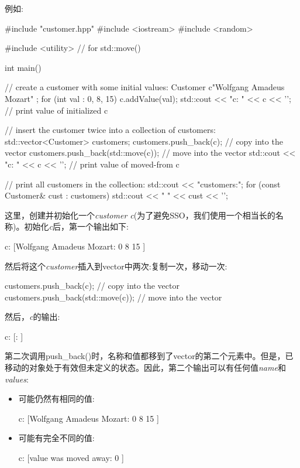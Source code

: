 例如:

\begin{cppcode}
#include "customer.hpp"
#include <iostream>
#include <random>

#include <utility> // for std::move()

int main()
{
	// create a customer with some initial values:
	Customer c{"Wolfgang Amadeus Mozart" };
	for (int val : {0, 8, 15}) {
		c.addValue(val);
	}
	std::cout << "c: " << c << '\n'; // print value of initialized c

	// insert the customer twice into a collection of customers:
	std::vector<Customer> customers;
	customers.push_back(c); // copy into the vector
	customers.push_back(std::move(c)); // move into the vector
	std::cout << "c: " << c << '\n'; // print value of moved-from c

	// print all customers in the collection:
	std::cout << "customers:\n";
	for (const Customer& cust : customers) {
		std::cout << " " << cust << '\n';
	}
}
\end{cppcode}

这里，创建并初始化一个\textit{customer c}(为了避免SSO，我们使用一个相当长的名称)。初始化\textit{c}后，第一个输出如下:

\begin{outputcode}
c: [Wolfgang Amadeus Mozart: 0 8 15 ]
\end{outputcode}

然后将这个\textit{customer}插入到vector中两次:复制一次，移动一次:

\begin{cppcode}
customers.push_back(c); // copy into the vector
customers.push_back(std::move(c)); // move into the vector
\end{cppcode}

然后，\textit{c}的输出:

\begin{outputcode}
c: [: ]
\end{outputcode}

第二次调用push_back()时，名称和值都移到了vector的第二个元素中。但是，已移动的对象处于有效但未定义的状态。因此，第二个输出可以有任何值\textit{name}和\textit{values}:

\begin{itemize}
	\item 可能仍然有相同的值:

	\begin{outputcode}
c: [Wolfgang Amadeus Mozart: 0 8 15 ]
	\end{outputcode}
	\item 可能有完全不同的值:

	\begin{outputcode}
c: [value was moved away: 0 ]
	\end{outputcode}
\end{itemize}

